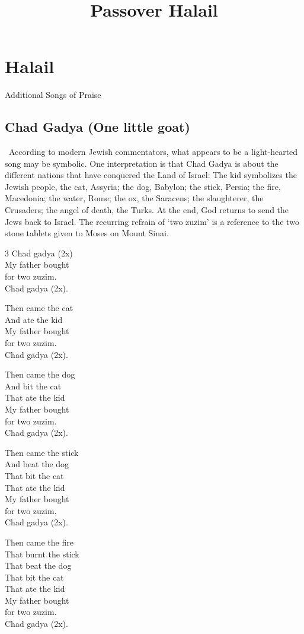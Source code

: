 \documentclass[12pt]{article}
\title{Passover Halail}
\newcommand{\god}{God}
\newcommand{\sederSection}[2]{
    \section*{#1 \Huge\cjRL{#2}}
}
\newcommand{\newReading}{\faBook{}\ }
\begin{document}
\sederSection{Halail}{hal*el}

Additional Songs of Praise

\vspace{1ex}
\begin{minipage}[t]{\textwidth}
\subsection*{Chad Gadya (One little goat)}
\newReading According to modern Jewish commentators, what appears to be a light-hearted song may be symbolic. One interpretation is that Chad Gadya is about the different nations that have conquered the Land of Israel: The kid symbolizes the Jewish people, the cat, Assyria; the dog, Babylon; the stick, Persia; the fire, Macedonia; the water, Rome; the ox, the Saracens; the slaughterer, the Crusaders; the angel of death, the Turks. At the end, {\god} returns to send the Jews back to Israel. The recurring refrain of `two zuzim' is a reference to the two stone tablets given to Moses on Mount Sinai. \\

\begin{multicols}{3}
Chad gadya (2x) \\
My father bought \\
for two zuzim. \\
Chad gadya (2x).

Then came the cat \\
And ate the kid \\
My father bought \\
for two zuzim. \\
Chad gadya (2x).

Then came the dog \\
And bit the cat \\
That ate the kid \\
My father bought \\
for two zuzim. \\
Chad gadya (2x).

Then came the stick \\
And beat the dog \\
That bit the cat \\
That ate the kid \\
My father bought \\
for two zuzim. \\
Chad gadya (2x).

Then came the fire \\
That burnt the stick \\
That beat the dog \\
That bit the cat \\
That ate the kid \\
My father bought \\
for two zuzim. \\
Chad gadya (2x).


\end{multicols}
\end{minipage}
\end{document}
